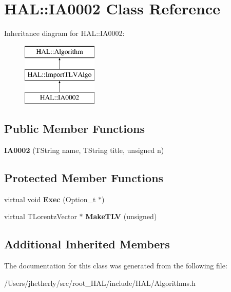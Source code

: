 \hypertarget{class_h_a_l_1_1_i_a0002}{\section{H\-A\-L\-:\-:I\-A0002 Class Reference}
\label{class_h_a_l_1_1_i_a0002}
}
Inheritance diagram for H\-A\-L\-:\-:I\-A0002\-:\begin{figure}[H]
\begin{center}
\leavevmode
\includegraphics[height=3.000000cm]{class_h_a_l_1_1_i_a0002}
\end{center}
\end{figure}
\subsection*{Public Member Functions}
\begin{DoxyCompactItemize}
\item 
\hypertarget{class_h_a_l_1_1_i_a0002_a81c04000d15411704c132cb249c2c382}{{\bfseries I\-A0002} (T\-String name, T\-String title, unsigned n)}\label{class_h_a_l_1_1_i_a0002_a81c04000d15411704c132cb249c2c382}

\end{DoxyCompactItemize}
\subsection*{Protected Member Functions}
\begin{DoxyCompactItemize}
\item 
\hypertarget{class_h_a_l_1_1_i_a0002_a364552f858102f8dce07701cc665101f}{virtual void {\bfseries Exec} (Option\-\_\-t $\ast$)}\label{class_h_a_l_1_1_i_a0002_a364552f858102f8dce07701cc665101f}

\item 
\hypertarget{class_h_a_l_1_1_i_a0002_a2b602a3be3bc043b8d8b5423f759361b}{virtual T\-Lorentz\-Vector $\ast$ {\bfseries Make\-T\-L\-V} (unsigned)}\label{class_h_a_l_1_1_i_a0002_a2b602a3be3bc043b8d8b5423f759361b}

\end{DoxyCompactItemize}
\subsection*{Additional Inherited Members}


The documentation for this class was generated from the following file\-:\begin{DoxyCompactItemize}
\item 
/\-Users/jhetherly/src/root\-\_\-\-H\-A\-L/include/\-H\-A\-L/Algorithms.\-h\end{DoxyCompactItemize}
